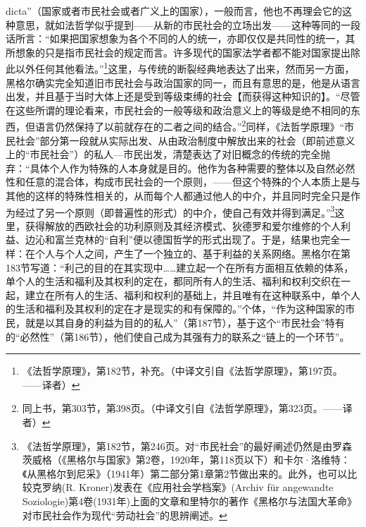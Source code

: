 dicta”（国家或者市民社会或者广义上的国家），一般而言，他也不再理会它的这种意思，就如法哲学似乎提到——从新的市民社会的立场出发——这种等同的一段话所言：“如果把国家想象为各个不同的人的统一，亦即仅仅是共同性的统一，其所想象的只是指市民社会的规定而言。许多现代的国家法学者都不能对国家提出除此以外任何其他看法。”\footnote{《法哲学原理》，第182节，补充。（中译文引自《法哲学原理》，第197页。——译者）}这里，与传统的断裂经典地表达了出来，然而另一方面，黑格尔确实完全知道旧市民社会与政治国家的同一，而且有意思的是，他是从语言出发，并且基于当时大体上还是受到等级束缚的社会【而获得这种知识的】。“尽管在这些所谓的理论看来，市民社会的一般等级和政治意义上的等级是绝不相同的东西，但语言仍然保持了以前就存在的二者之间的结合。”\footnote{同上书，第303节，第398页。（中译文引自《法哲学原理》，第323页。——译者）}同样，《法哲学原理》“市民社会”部分第一段就从实际出发、从由政治制度中解放出来的社会（即前述意义上的“市民社会”）的私人—市民出发，清楚表达了对旧概念的传统的完全抛弃：“具体个人作为特殊的人本身就是目的。他作为各种需要的整体以及自然必然性和任意的混合体，构成市民社会的一个原则，——但这个特殊的个人本质上是与其他的这样的特殊性相关的，从而每个人都通过他人的中介，并且同时完全只是作为经过了另一个原则（即普遍性的形式）的中介，使自己有效并得到满足。”\footnote{《法哲学原理》，第182节，第246页。对“市民社会”的最好阐述仍然是由罗森茨威格（《黑格尔与国家》第2卷，1920年，第118页以下）和卡尔·洛维特：《从黑格尔到尼采》（1941年）第二部分第1章第2节做出来的。此外，也可以比较克罗纳(R. Kroner)发表在《应用社会学档案》(Archiv für angewandte Soziologie)第4卷(1931年)上面的文章和里特尔的著作《黑格尔与法国大革命》对市民社会作为现代“劳动社会”的思辨阐述。}这里，获得解放的西欧社会的功利原则及其经济模式、狄德罗和爱尔维修的个人利益、边沁和富兰克林的“自利”便以德国哲学的形式出现了。于是，结果也完全一样：在个人与个人之间，产生了一个独立的、基于利益的关系网络。黑格尔在第183节写道：“利己的目的在其实现中……建立起一个在所有方面相互依赖的体系，单个人的生活和福利及其权利的定在，都同所有人的生活、福利和权利交织在一起，建立在所有人的生活、福利和权利的基础上，并且唯有在这种联系中，单个人的生活和福利及其权利的定在才是现实的和有保障的。”个体，“作为这种国家的市民，就是以其自身的利益为目的的私人”（第187节），基于这个“市民社会”特有的“必然性”（第186节），他们使自己成为其强有力的联系之“链上的一个环节”。

